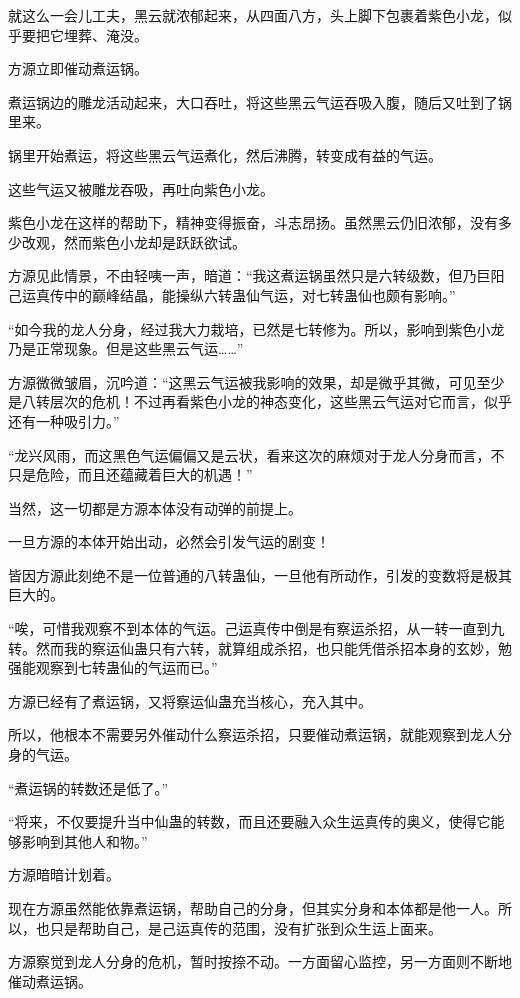 \begin{this_body}
就这么一会儿工夫，黑云就浓郁起来，从四面八方，头上脚下包裹着紫色小龙，似乎要把它埋葬、淹没。

方源立即催动煮运锅。

煮运锅边的雕龙活动起来，大口吞吐，将这些黑云气运吞吸入腹，随后又吐到了锅里来。

锅里开始煮运，将这些黑云气运煮化，然后沸腾，转变成有益的气运。

这些气运又被雕龙吞吸，再吐向紫色小龙。

紫色小龙在这样的帮助下，精神变得振奋，斗志昂扬。虽然黑云仍旧浓郁，没有多少改观，然而紫色小龙却是跃跃欲试。

方源见此情景，不由轻咦一声，暗道：“我这煮运锅虽然只是六转级数，但乃巨阳己运真传中的巅峰结晶，能操纵六转蛊仙气运，对七转蛊仙也颇有影响。”

“如今我的龙人分身，经过我大力栽培，已然是七转修为。所以，影响到紫色小龙乃是正常现象。但是这些黑云气运……”

方源微微皱眉，沉吟道：“这黑云气运被我影响的效果，却是微乎其微，可见至少是八转层次的危机！不过再看紫色小龙的神态变化，这些黑云气运对它而言，似乎还有一种吸引力。”

“龙兴风雨，而这黑色气运偏偏又是云状，看来这次的麻烦对于龙人分身而言，不只是危险，而且还蕴藏着巨大的机遇！”

当然，这一切都是方源本体没有动弹的前提上。

一旦方源的本体开始出动，必然会引发气运的剧变！

皆因方源此刻绝不是一位普通的八转蛊仙，一旦他有所动作，引发的变数将是极其巨大的。

“唉，可惜我观察不到本体的气运。己运真传中倒是有察运杀招，从一转一直到九转。然而我的察运仙蛊只有六转，就算组成杀招，也只能凭借杀招本身的玄妙，勉强能观察到七转蛊仙的气运而已。”

方源已经有了煮运锅，又将察运仙蛊充当核心，充入其中。

所以，他根本不需要另外催动什么察运杀招，只要催动煮运锅，就能观察到龙人分身的气运。

“煮运锅的转数还是低了。”

“将来，不仅要提升当中仙蛊的转数，而且还要融入众生运真传的奥义，使得它能够影响到其他人和物。”

方源暗暗计划着。

现在方源虽然能依靠煮运锅，帮助自己的分身，但其实分身和本体都是他一人。所以，也只是帮助自己，是己运真传的范围，没有扩张到众生运上面来。

方源察觉到龙人分身的危机，暂时按捺不动。一方面留心监控，另一方面则不断地催动煮运锅。


\end{this_body}
